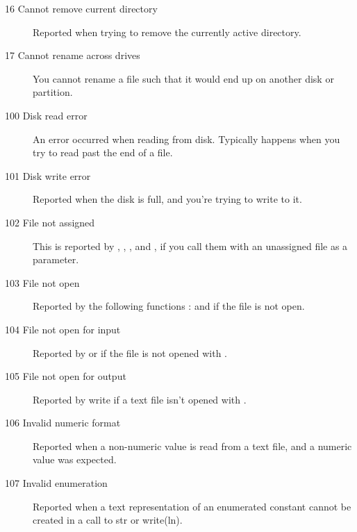 \begin{description}
\item [16  Cannot remove current directory]
Reported when trying to remove the currently active directory.

\item [17  Cannot rename across drives]
You cannot rename a file such that it would end up on another disk or
partition.

\item [100  Disk read error]
An error occurred when reading from disk. Typically happens when you try
to read past the end of a file.

\item [101  Disk write error]
Reported when the disk is full, and you're trying to write to it.

\item [102  File not assigned]
This is reported by , , ,
 and , if you call
them with an unassigned file as a parameter.

\item [103  File not open]
Reported by the following functions :  and  if the
file is not open.

\item [104  File not open for input]
Reported by  or  if
the file is not opened with .

\item [105  File not open for output]
Reported by write if a text file isn't opened with .

\item [106  Invalid numeric format]
Reported when a non-numeric value is read from a text file, and a numeric
value was expected.

\item [107  Invalid enumeration]
Reported when a text representation of an enumerated constant cannot be
created in a call to str or write(ln).


\end{description}
